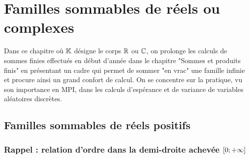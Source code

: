 \chapter{Familles sommables de réels ou complexes}
\minitoc 
Dans ce chapitre où \(\mathbb{K}\) désigne le corps \(\mathbb{R}\) ou \(\mathbb{C}\), on prolonge les calculs de sommes finies effectués en début d’année dans le chapitre "Sommes et produits finis" en présentant un cadre qui permet de sommer "en vrac" une famille infinie et procure ainsi un grand confort de calcul. On se concentre sur la pratique, vu son importance en MPI, dans les calculs d’espérance et de variance de variables aléatoires discrètes.
\section{Familles sommables de réels positifs}
\subsection{Rappel : relation d’ordre dans la demi-droite achevée \(\left[0;+\infty\right]\)}

